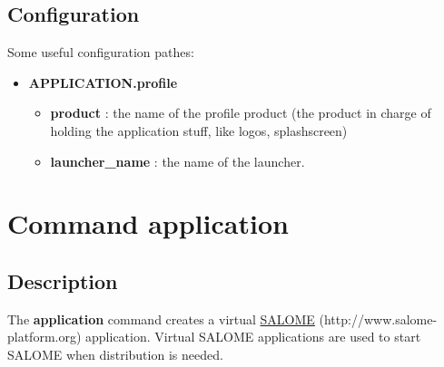 \documentclass[a4paper,10pt,english]{sphinxmanual}
\begin{document}
\subsection{Configuration}
\label{commands/launcher:configuration}
Some useful configuration pathes:
\begin{itemize}
\item {} 
\textbf{APPLICATION.profile}
\begin{itemize}
\item {} 
\textbf{product} : the name of the profile product (the product in charge of holding the application stuff, like logos, splashscreen)

\item {} 
\textbf{launcher\_name} : the name of the launcher.

\end{itemize}

\end{itemize}


\section{Command application}
\label{commands/application:svn}\label{commands/application::doc}\label{commands/application:command-application}

\subsection{Description}
\label{commands/application:description}
The \textbf{application} command creates a virtual \href{http://www.salome-platform.org}{SALOME} (http://www.salome-platform.org) application.
Virtual SALOME applications are used to start SALOME when distribution is needed.
\end{document}
